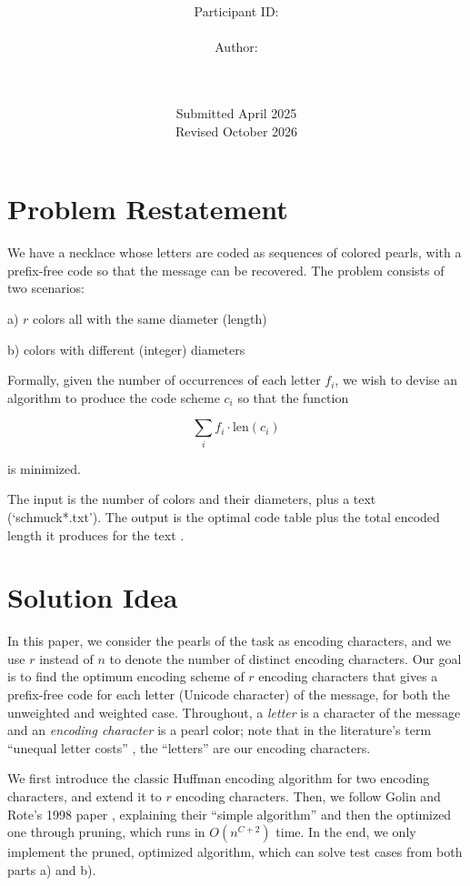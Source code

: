 \documentclass[a4paper,10pt,english]{scrartcl}
\title{\textbf{\Huge\Aufgabe}}
\author{\LARGE Participant ID: \LARGE \TeilnahmeId \\\\
	    \LARGE Author: \\ 
	    \LARGE \Name\\\\}
\date{\LARGE Submitted April 2025 \\ Revised October 2026}
\begin{document}
\maketitle
\tableofcontents

\vspace{0.5cm}

\section{Problem Restatement}\label{sec:problem}

We have a necklace whose letters are coded as sequences of colored pearls, with a prefix-free code so that the message can be recovered. The problem consists of two scenarios:

a) $r$ colors all with the same diameter (length)

b) colors with different (integer) diameters

Formally, given the number of occurrences of each letter $f_i$, we wish to devise an algorithm to produce the code scheme $c_i$ so that the function

$$
\sum_i f_i \cdot \text{len}(c_i)
$$

is minimized. 

The input is the number of colors and their diameters, plus a text (`schmuck*.txt'). The output is the optimal code table plus the total encoded length it produces for the text \cite{BWINF2025}. 

\section{Solution Idea}\label{sec:idea}

In this paper, we consider the pearls of the task as encoding characters, and we use $r$ instead of $n$ to denote the number of distinct encoding characters. Our goal is to find the optimum encoding scheme of $r$ encoding characters that gives a prefix-free code for each letter (Unicode character) of the message, for both the unweighted and weighted case. Throughout, a \emph{letter} is a character of the message and an \emph{encoding character} is a pearl color; note that in the literature's term ``unequal letter costs'' \cite{GolinRote1998}, the ``letters'' are our encoding characters.

We first introduce the classic Huffman encoding algorithm for two encoding characters, and extend it to $r$ encoding characters. Then, we follow Golin and Rote's 1998 paper \cite{GolinRote1998}, explaining their ``simple algorithm'' and then the optimized one through pruning, which runs in $O(n^{C+2})$ time. In the end, we only implement the pruned, optimized algorithm, which can solve test cases from both parts a) and b).
\end{document}
